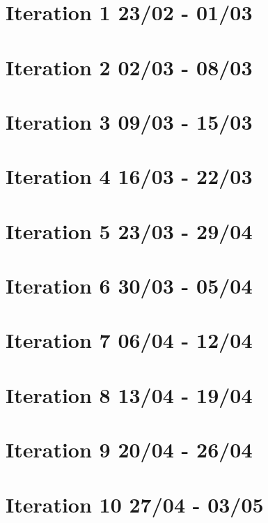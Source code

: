 \section{Iteration 1 23/02 - 01/03}



\section{Iteration 2 02/03 - 08/03}



\section{Iteration 3 09/03 - 15/03}



\section{Iteration 4 16/03 - 22/03}



\section{Iteration 5 23/03 - 29/04}



\section{Iteration 6 30/03 - 05/04}



\section{Iteration 7 06/04 - 12/04}



\section{Iteration 8 13/04 - 19/04}



\section{Iteration 9 20/04 - 26/04}



\section{Iteration 10 27/04 - 03/05}

